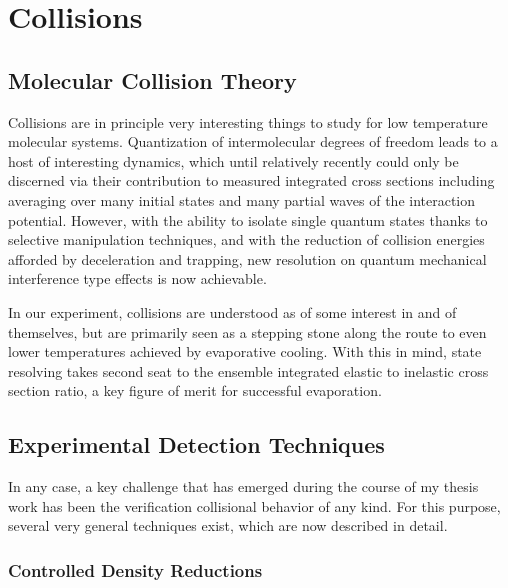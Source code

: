 \ifx\justbeingincluded\undefined

\fi

\chapter{Collisions}
\label{chapter:collisions}

\section{Molecular Collision Theory}

Collisions are in principle very interesting things to study for low temperature molecular systems. 
Quantization of intermolecular degrees of freedom leads to a host of interesting dynamics, which until relatively recently could only be discerned via their contribution to measured integrated cross sections including averaging over many initial states and many partial waves of the interaction potential.
However, with the ability to isolate single quantum states thanks to selective manipulation techniques, and with the reduction of collision energies afforded by deceleration and trapping, new resolution on quantum mechanical interference type effects is now achievable.

In our experiment, collisions are understood as of some interest in and of themselves, but are primarily seen as a stepping stone along the route to even lower temperatures achieved by evaporative cooling.
With this in mind, state resolving takes second seat to the ensemble integrated elastic to inelastic cross section ratio, a key figure of merit for successful evaporation.

\section{Experimental Detection Techniques}

In any case, a key challenge that has emerged during the course of my thesis work has been the verification collisional behavior of any kind.
For this purpose, several very general techniques exist, which are now described in detail.

\subsection{Controlled Density Reductions}

